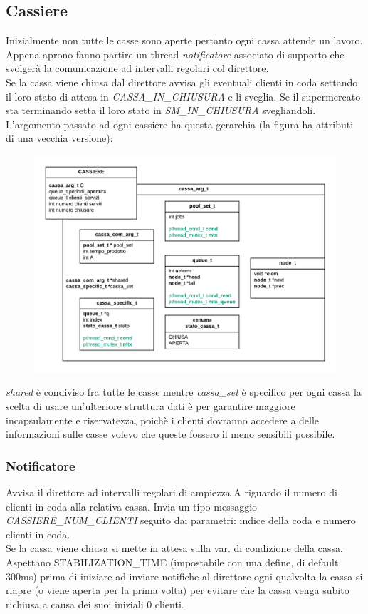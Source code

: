 \documentclass[11pt, a4paper]{article}
\begin{document}
\subsection{Cassiere}
Inizialmente non tutte le casse sono aperte pertanto ogni cassa attende un lavoro. Appena aprono fanno partire un thread \textit{notificatore} associato di supporto che svolgerà la comunicazione ad intervalli regolari col direttore.\\
Se la cassa viene chiusa dal direttore avvisa gli eventuali clienti in coda settando il loro stato di attesa in \textit{CASSA\_IN\_CHIUSURA} e li sveglia. Se il supermercato sta terminando setta il loro stato in \textit{SM\_IN\_CHIUSURA} svegliandoli.
L'argomento passato ad ogni cassiere ha questa gerarchia (la figura ha attributi di una vecchia versione):
\begin{figure}[h]
	\centering
	\includegraphics[scale=0.75]{cassa.png}
	\label{fig:cassa}
\end{figure}
\textit{shared} è condiviso fra tutte le casse mentre \textit{cassa\_set} è specifico per ogni cassa
la scelta di  usare un'ulteriore struttura dati è 
per garantire maggiore incapsulamente e riservatezza, poichè i clienti dovranno accedere a delle informazioni sulle casse volevo che queste fossero il meno sensibili possibile.
\subsubsection{Notificatore}
Avvisa il direttore ad intervalli regolari di ampiezza A riguardo il numero di clienti in coda alla relativa cassa. Invia un tipo messaggio \textit{CASSIERE\_NUM\_CLIENTI} seguito dai parametri: indice della coda e numero clienti in coda.\\
Se la cassa viene chiusa si mette in attesa sulla var. di condizione della cassa.\\
Aspettano STABILIZATION\_TIME (impostabile con una define, di default 300ms) prima di iniziare ad inviare notifiche al direttore ogni qualvolta la cassa si riapre (o viene aperta per la prima volta) per evitare che la cassa venga subito richiusa a causa dei suoi iniziali 0 clienti.
\end{document}
